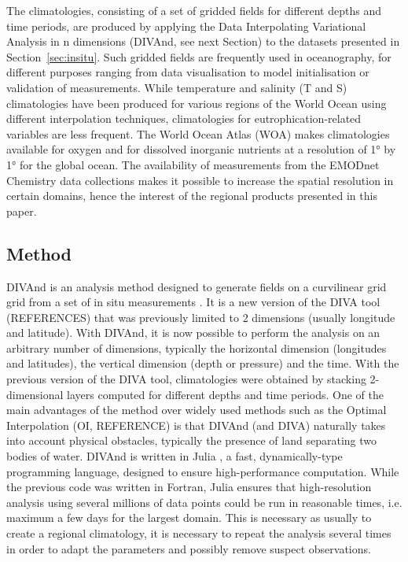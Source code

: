\documentclass[essd, manuscript]{copernicus}
\begin{document}
The climatologies, consisting of a set of gridded fields for different depths and time periods, are produced by applying the Data Interpolating Variational Analysis in n dimensions (DIVAnd, see next Section) to the datasets presented in Section~\ref{sec:insitu}. Such gridded fields are frequently used in oceanography, for different purposes ranging from data visualisation to model initialisation or validation of measurements.  
While temperature and salinity (T and S) climatologies have been produced for various regions of the World Ocean using different interpolation techniques, climatologies for eutrophication-related variables are less frequent. The World Ocean Atlas (WOA) makes climatologies available for oxygen \citep[Dissolved Oxygen, Apparent Oxygen Utilization, and Oxygen Saturation][]{Garcia2024} and for dissolved inorganic nutrients \citep[phosphate, nitrate and nitrate+nitrite, silicate][]{Garcia2024b} at a resolution of 1° by 1° for the global ocean. The availability of measurements from the EMODnet Chemistry data collections makes it  possible to increase the spatial resolution in certain domains, hence the interest of the regional products presented in this paper.


\subsection{Method}

DIVAnd is an analysis method designed to generate fields on a curvilinear grid grid from a set of in situ measurements \citep{BARTH2014}. It is a new version of the DIVA tool (REFERENCES) that was previously limited to 2 dimensions (usually longitude and latitude). With DIVAnd, it is now possible to perform the analysis on an arbitrary number of dimensions, typically the horizontal dimension (longitudes and latitudes), the vertical dimension (depth or pressure) and the time. With the previous version of  the DIVA tool, climatologies were obtained by stacking 2-dimensional layers computed for different depths and time periods. 
One of the main advantages of the method over widely used methods such as the Optimal Interpolation (OI, REFERENCE) is that DIVAnd (and DIVA) naturally takes into account physical obstacles, typically the presence of land separating two bodies of water.  
DIVAnd is written in Julia \citep{Bezanson2017}, a fast, dynamically-type programming language, designed to ensure high-performance computation. While the previous code was written in Fortran, Julia ensures that high-resolution analysis using several millions of data points could be run in reasonable times, i.e. maximum a few days for the largest domain. This is necessary as usually to create a regional climatology, it is necessary to repeat the analysis several times in order to adapt the parameters and possibly remove suspect observations.
\end{document}
